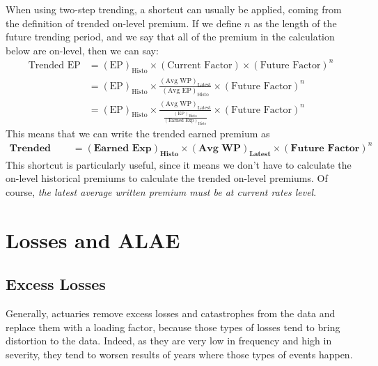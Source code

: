 \documentclass[11pt, english]{memoir}
\numberwithin{definition}{section}
\begin{document}
	
		\begin{tcolorbox}[adjusted title = \textbf{SHORCUT}]
			When using two-step trending, a shortcut can usually be applied, coming from the definition of trended on-level premium. If we define $ n $ as the length of the future trending period, and we say that all of the premium in the calculation below are on-level, then we can say:
			\begin{align*}
			\text{Trended EP} 
				&= (\text{EP})_{\text{Histo}} \times (\text{Current Factor}) \times (\text{Future Factor})^{n} \\
				&= (\text{EP})_{\text{Histo}} \times \frac{(\text{Avg WP})_{\text{Latest}}}{(\text{Avg EP})_{\text{Histo}}} \times (\text{Future Factor})^{n}\\
				&=  (\text{EP})_{\text{Histo}} \times \frac{(\text{Avg WP})_{\text{Latest}}}{\frac{(\text{EP})_{\text{Histo}}}{(\text{Earned Exp})_{\text{Histo}}} } \times (\text{Future Factor})^{n}
			\end{align*}
			This means that we can write the trended earned premium as 
			\begin{align*}
			\textbf{Trended EP} 
				&=  (\textbf{Earned Exp})_{\textbf{Histo}} \times (\textbf{Avg WP})_{\textbf{Latest}} \times (\textbf{Future Factor})^{n}
			\end{align*}
			This shortcut is particularly useful, since it means we don't have to calculate the on-level historical premiums to calculate the trended on-level premiums. Of course, \emph{the latest average written premium must be at current rates level}. 
		\end{tcolorbox}
	
	
	
	
	
	
	
	
	
	
\chapter{Losses and ALAE}


\section{Excess Losses}

Generally, actuaries remove excess losses and catastrophes from the data and replace them with a loading factor, because those types of losses tend to bring distortion to the data. Indeed, as they are very low in frequency and high in severity, they tend to worsen results of years where those types of events happen. 
\end{document}
